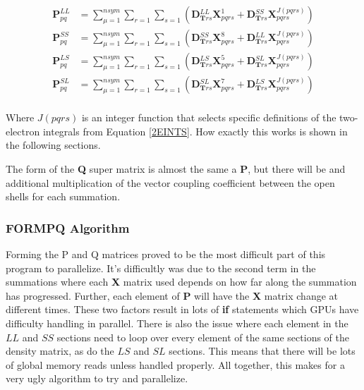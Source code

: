 \documentclass[12pt]{report}
\begin{document}
\begin{equation}
\label{PSMTX}
\begin{split}
\textbf{P}^{LL}_{pq}	&	= \sum_{\mu = 1}^{nsym}\sum_{r=1}\sum_{s=1}\left(\textbf{D$^{LL}_{\textbf{T}rs}$}\textbf{X}^{1}_{pqrs} + \textbf{D$^{SS}_{\textbf{T}rs}$}\textbf{X}^{J(pqrs)}_{pqrs}\right)	\\
\textbf{P}^{SS}_{pq}	&	= \sum_{\mu = 1}^{nsym}\sum_{r=1}\sum_{s=1}\left(\textbf{D$^{SS}_{\textbf{T}rs}$}\textbf{X}^{8}_{pqrs} + \textbf{D$^{LL}_{\textbf{T}rs}$}\textbf{X}^{J(pqrs)}_{pqrs}\right)	\\
\textbf{P}^{LS}_{pq}	&	= \sum_{\mu = 1}^{nsym}\sum_{r=1}\sum_{s=1}\left(\textbf{D$^{LS}_{\textbf{T}rs}$}\textbf{X}^{5}_{pqrs} + \textbf{D$^{SL}_{\textbf{T}rs}$}\textbf{X}^{J(pqrs)}_{pqrs}\right)	\\
\textbf{P}^{SL}_{pq}	&	= \sum_{\mu = 1}^{nsym}\sum_{r=1}\sum_{s=1}\left(\textbf{D$^{SL}_{\textbf{T}rs}$}\textbf{X}^{7}_{pqrs} + \textbf{D$^{LS}_{\textbf{T}rs}$}\textbf{X}^{J(pqrs)}_{pqrs}\right)	\\
\end{split}
\end{equation}

Where $J(pqrs)$ is an integer function that selects specific definitions of the two-electron integrals from Equation \ref{2EINTS}. How exactly this works is shown in the following sections.

The form of the \textbf{Q} super matrix is almost the same a \textbf{P}, but there will be and additional multiplication of the vector coupling coefficient between the open shells for each summation.

\subsubsection{FORMPQ Algorithm}
Forming the P and Q matrices proved to be the most difficult part of this program to parallelize. It's difficultly was due to the second term in the summations where each \textbf{X} matrix used depends on how far along the summation has progressed. Further, each element of \textbf{P} will have the \textbf{X} matrix change at different times. These two factors result in lots of \textbf{if} statements which GPUs have difficulty handling in parallel. There is also the issue where each element in the $LL$ and $SS$ sections need to loop over every element of the same sections of the density matrix, as do the $LS$ and $SL$ sections. This means that there will be lots of global memory reads unless handled properly. All together, this makes for a very ugly algorithm to try and parallelize.
\end{document}

